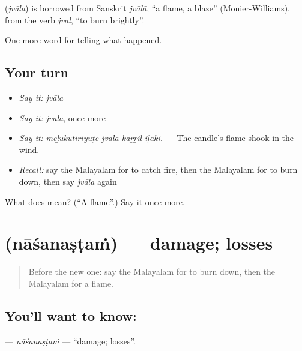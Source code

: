 \begin{cousinweb}
\textbf{} (\emph{jvāla}) is borrowed from Sanskrit \emph{jvālā}, \textquotedblleft{}a flame, a blaze\textquotedblright{} (Monier-Williams), from the verb \emph{jval}, \textquotedblleft{}to burn brightly\textquotedblright{}.
\end{cousinweb}

\begin{grammarlens}[title={What you've built}]
One more word for telling what happened.
\end{grammarlens}

\subsection*{Your turn}
\begin{itemize}
\raggedright
  \item \emph{Say it:} \emph{jvāla}
  \item \emph{Say it:} \emph{jvāla}, once more
  \item \emph{Say it:} \emph{meḻukutiriyuṭe jvāla kāṟṟil iḷaki.} — The candle's flame shook in the wind.
  \item \emph{Recall:} say the Malayalam for to catch fire, then the Malayalam for to burn down, then say \emph{jvāla} again
\end{itemize}

\begin{tcolorbox}[breakable,colback=teal!4,colframe=teal!35!black,title={Before you move on}]
What does  mean? (\textquotedblleft{}A flame\textquotedblright{}.) Say it once more.
\end{tcolorbox}
\section[\texorpdfstring{\ml{നാശനഷ്ടം} (nāśanaṣṭaṁ)}{നാശനഷ്ടം (nāśanaṣṭaṁ)}]{ (nāśanaṣṭaṁ) — damage; losses}

\label{lesson:ML-C363-nasanastam}



\begin{quote}
Before the new one: say the Malayalam for to burn down, then the Malayalam for a flame.
\end{quote}

\subsection*{You'll want to know: }
\textbf{} — \emph{nāśanaṣṭaṁ} — \textquotedblleft{}damage; losses\textquotedblright{}.

